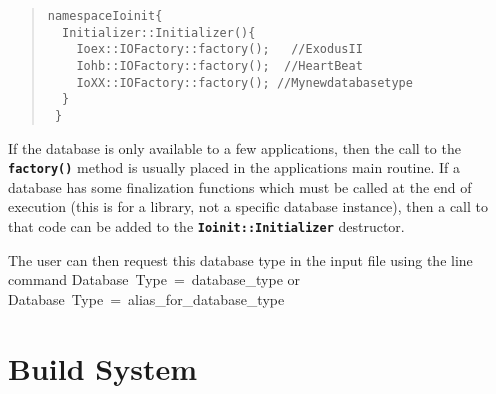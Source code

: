 \documentclass[11pt,twoside]{article}
\newcommand{\cmd}[1]
   {\mbox{\sf #1}\null}
\newcommand{\code}[1]
   {\mbox{\bf\tt #1}\null}
\newenvironment{source}
{\small\begin{quote}\begin{alltt}}
{\end{alltt}\end{quote}\normalsize}
\begin{document}
\begin{source}
 namespace Ioinit \{
 \ \ Initializer::Initializer() \{
 \ \ \ \ Ioex::IOFactory::factory(); \ \ \ // ExodusII
 \ \ \ \ Iohb::IOFactory::factory(); \ \ // HeartBeat
 \ \ \ \ IoXX::IOFactory::factory(); \ // My new database type
 \ \ \}
 \ \}
\end{source}
If the database is only available to a few applications, then the call
to the \code{factory()} method is usually placed in the
applications main routine. If a database has some finalization
functions which must be called at the end of execution (this is for a
library, not a specific database instance), then a call to that code
can be added to the \code{Ioinit::Initializer} destructor.

The user can then request this database type in the input file using the
line command \cmd{Database Type = database\_type} or \cmd{Database Type =
alias\_for\_database\_type}

\section{Build System}
\end{document}
